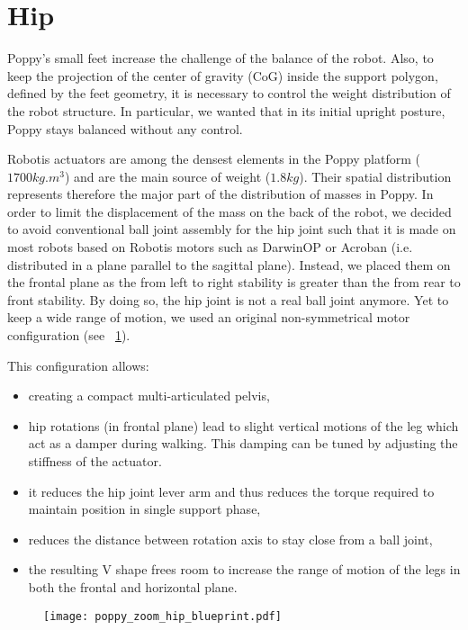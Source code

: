 \section{Hip} %
\label{sec:hip}


Poppy's small feet increase the challenge of the balance of the robot. Also, to keep the projection of the center of gravity (CoG) inside the support polygon, defined by the feet geometry, it is necessary to control the weight distribution of the robot structure. In particular, we wanted that in its initial upright posture, Poppy stays balanced without any control.

Robotis actuators are among the densest elements in the Poppy platform ($ 1700 kg.m^{3} $) and are the main source of weight ($1.8 kg$). Their spatial distribution represents therefore the major part of the distribution of masses in Poppy. In order to limit the displacement of the mass on the back of the robot, we decided to avoid conventional ball joint assembly for the hip joint such that it is made on most robots based on Robotis motors such as DarwinOP or Acroban (i.e. distributed in a plane parallel to the sagittal plane). Instead, we placed them on the frontal plane as the from left to right stability is greater than the from rear to front stability. By doing so, the hip joint is not a real ball joint anymore. Yet to keep a wide range of motion, we used an original non-symmetrical motor configuration (see \figurename~\ref{fig:poppy_zoom_hip_blueprint}).

This configuration allows:

\begin{itemize}
    \item creating a compact multi-articulated pelvis,
    \item hip rotations (in frontal plane) lead to slight vertical motions of the leg which act as a damper during walking. This damping can be tuned by adjusting the stiffness of the actuator.
    \item it reduces the hip joint lever arm and thus reduces the torque required to maintain position in single support phase,
    \item reduces the distance between rotation axis to stay close from a ball joint,
    \item the resulting V shape frees room to increase the range of motion of the legs in both the frontal and horizontal plane.
\end{itemize}

\begin{figure}[p]
    \begin{center}
        \texttt{[image: poppy\_zoom\_hip\_blueprint.pdf]}
    \end{center}
    \caption{}
    \label{fig:poppy_zoom_hip_blueprint}
\end{figure}

